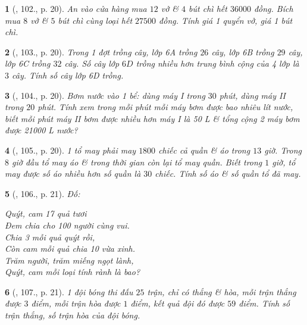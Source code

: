 \documentclass{article}
\newtheorem{baitoan}{}
\begin{document}
\begin{baitoan}[\cite{Binh_Toan_6_tap_1}, 102., p. 20]
	An vào cửa hàng mua $12$ vở \& $4$ bút chì hết $36000$ đồng. Bích mua $8$ vở \& $5$ bút chì cùng loại hết $27500$ đồng. Tính giá 1 quyển vở, giá 1 bút chì.
\end{baitoan}

\begin{baitoan}[\cite{Binh_Toan_6_tap_1}, 103., p. 20]
	Trong 1 đợt trồng cây, lớp 6A trồng $26$ cây, lớp 6B trồng $29$ cây, lớp 6C trồng $32$ cây. Số cây lớp $6D$ trồng nhiều hơn trung bình cộng của 4 lớp là $3$ cây. Tính số cây lớp 6D trồng.
\end{baitoan}

\begin{baitoan}[\cite{Binh_Toan_6_tap_1}, 104., p. 20]
	Bơm nước vào 1 bể: dùng máy {\rm I} trong $30$ phút, dùng máy {\rm II} trong $20$ phút. Tính xem trong mỗi phút mỗi máy bơm được bao nhiêu lít nước, biết mỗi phút máy {\rm II} bơm được nhiều hơn máy {\rm I} là {\rm50 L} \& tổng cộng 2 máy bơm được {\rm21000 L} nước?
\end{baitoan}

\begin{baitoan}[\cite{Binh_Toan_6_tap_1}, 105., p. 20]
	1 tổ may phải may $1800$ chiếc cả quần \& áo trong $13$ giờ. Trong $8$ giờ đầu tổ may áo \& trong thời gian còn lại tổ may quần. Biết trong $1$ giờ, tổ may được số áo nhiều hơn số quần là $30$ chiếc. Tính số áo \& số quần tổ đã may.
\end{baitoan}

\begin{baitoan}[\cite{Binh_Toan_6_tap_1}, 106., p. 21]
	Đố:
	\begin{center}
		Quýt, cam 17 quả tươi\\Đem chia cho 100 người cùng vui.\\Chia 3 mỗi quả quýt rồi,\\Còn cam mỗi quả chia 10 vừa xinh.\\Trăm người, trăm miếng ngọt lành,\\Quýt, cam mỗi loại tính rành là bao?
	\end{center}
\end{baitoan}

\begin{baitoan}[\cite{Binh_Toan_6_tap_1}, 107., p. 21]
	1 đội bóng thi đấu $25$ trận, chỉ có thắng \& hòa, mỗi trận thắng được $3$ điểm, mỗi trận hòa được $1$ điểm, kết quả đội đó được $59$ điểm. Tính số trận thắng, số trận hòa của đội bóng.
\end{baitoan}
\end{document}
